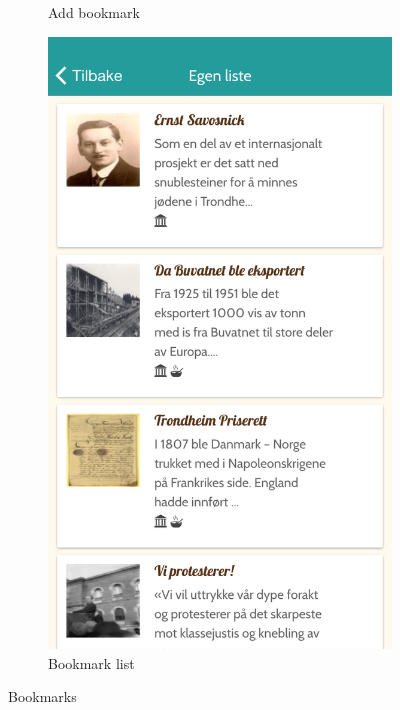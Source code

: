 \begin{appendices}
\begin{figure}[h!]
\begin{subfigure}[h]{0.3\textwidth}
			\caption{Add bookmark}
		\end{subfigure}
		\hspace{1cm}
		\begin{subfigure}[h]{0.3\textwidth}
			\includegraphics[width=\textwidth]{fig/screenshot_list}
			\caption{Bookmark list}
		\end{subfigure}
		\caption{Bookmarks}
		\label{fig:manual_bookmarks}
	\end{figure}


\end{appendices}
